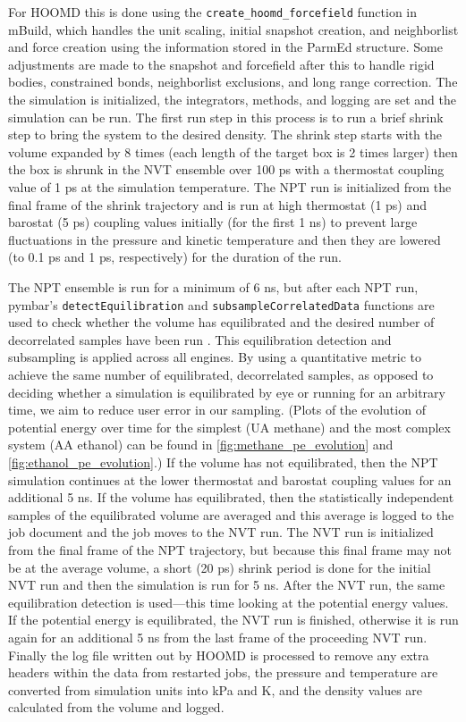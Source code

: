 For HOOMD this is done using the \lstinline{create_hoomd_forcefield} function in mBuild, which handles the unit scaling, initial snapshot creation, and neighborlist and force creation using the information stored in the ParmEd structure. 
Some adjustments are made to the snapshot and forcefield after this to handle rigid bodies, constrained bonds, neighborlist exclusions, and long range correction. 
The the simulation is initialized, the integrators, methods, and logging are set and the simulation can be run. 
The first run step in this process is to run a brief shrink step to bring the system to the desired density. 
The shrink step starts with the volume expanded by 8 times (each length of the target box is 2 times larger) then the box is shrunk in the NVT ensemble over 100 ps with a thermostat coupling value of 1 ps at the simulation temperature. 
The NPT run is initialized from the final frame of the shrink trajectory and is run at high thermostat (1 ps) and barostat (5 ps) coupling values initially (for the first 1 ns) to prevent large fluctuations in the pressure and kinetic temperature and then they are lowered (to 0.1 ps and 1 ps, respectively) for the duration of the run. %

The NPT ensemble is run for a minimum of 6 ns, but after each NPT run, pymbar's \lstinline{detectEquilibration} and \lstinline{subsampleCorrelatedData} functions are used to check whether the volume has equilibrated and the desired number of decorrelated samples have been run \cite{Chodera2007, Chodera2016, Shirts2008a}. 
This equilibration detection and subsampling is applied across all engines.
By using a quantitative metric to achieve the same number of equilibrated, decorrelated samples, as opposed to deciding whether a simulation is equilibrated by eye or running for an arbitrary time, we aim to reduce user error in our sampling.
(Plots of the evolution of potential energy over time for the simplest (UA methane) and the most complex system (AA ethanol) can be found in \autoref{fig:methane_pe_evolution} and  \autoref{fig:ethanol_pe_evolution}.)
If the volume has not equilibrated, then the NPT simulation continues at the lower thermostat and barostat coupling values for an additional 5 ns. 
If the volume has equilibrated, then the statistically independent samples of the equilibrated volume are averaged and this average is logged to the job document and the job moves to the NVT run. 
The NVT run is initialized from the final frame of the NPT trajectory, but because this final frame may not be at the average volume, a short (20 ps) shrink period is done for the initial NVT run and then the simulation is run for 5 ns. 
After the NVT run, the same equilibration detection is used---this time looking at the potential energy values. If the potential energy is equilibrated, the NVT run is finished, otherwise it is run again for an additional 5 ns from the last frame of the proceeding NVT run. 
Finally the log file written out by HOOMD is processed to remove any extra headers within the data from restarted jobs, the pressure and temperature are converted from simulation units into kPa and K, and the density values are calculated from the volume and logged.

